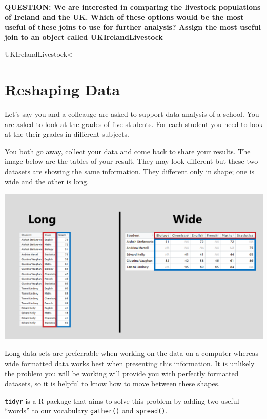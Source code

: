 \documentclass[]{book}
\newenvironment{Shaded}{\begin{snugshade}}{\end{snugshade}}
\newcommand{\NormalTok}[1]{#1}
\begin{document}
\textbf{QUESTION: We are interested in comparing the livestock populations of Ireland and the UK. Which of these options would be the most useful of these joins to use for further analysis? Assign the most useful join to an object called UKIrelandLivestock}

\begin{Shaded}
\begin{Highlighting}[]
\NormalTok{UKIrelandLivestock<-}
\end{Highlighting}
\end{Shaded}

\hypertarget{reshaping-data}{%
\chapter{Reshaping Data}\label{reshaping-data}}

Let's say you and a colleauge are asked to support data analysis of a school. You are asked to look at the grades of five students. For each student you need to look at the their grades in different subjects.

You both go away, collect your data and come back to share your results. The image below are the tables of your result. They may look different but these two datasets are showing the same information. They different only in shape; one is wide and the other is long.

\includegraphics[width=17.78in]{Images/longandwide}

Long data sets are preferrable when working on the data on a computer whereas wide formatted data works best when presenting this information. It is unlikely the problem you will be working will provide you with perfectly formatted datasets, so it is helpful to know how to move between these shapes.

\texttt{tidyr} is a R package that aims to solve this problem by adding two useful ``words'' to our vocabulary \texttt{gather()} and \texttt{spread()}.
\end{document}
